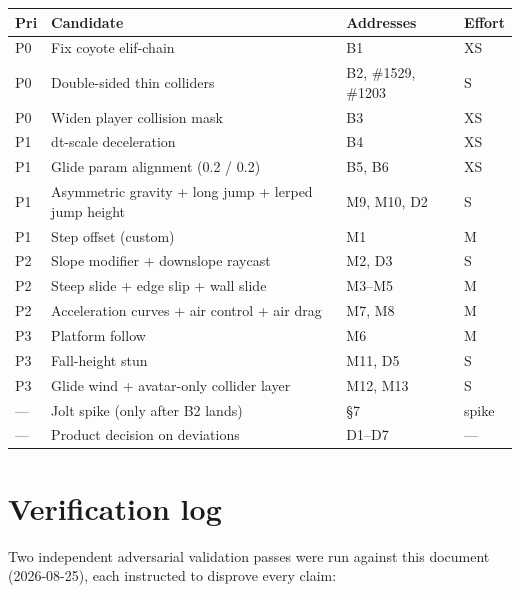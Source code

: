 \documentclass[11pt]{article}
\begin{document}
\begin{center}\footnotesize
\begin{tabular}{@{}l L{9cm} l l@{}}
\toprule
Pri & Candidate & Addresses & Effort \\
\midrule
P0 & Fix coyote elif-chain & B1 & XS \\
P0 & Double-sided thin colliders & B2, \#1529, \#1203 & S \\
P0 & Widen player collision mask & B3 & XS \\
P1 & dt-scale deceleration & B4 & XS \\
P1 & Glide param alignment (0.2 / 0.2) & B5, B6 & XS \\
P1 & Asymmetric gravity + long jump + lerped jump height & M9, M10, D2 & S \\
P1 & Step offset (custom) & M1 & M \\
P2 & Slope modifier + downslope raycast & M2, D3 & S \\
P2 & Steep slide + edge slip + wall slide & M3--M5 & M \\
P2 & Acceleration curves + air control + air drag & M7, M8 & M \\
P3 & Platform follow & M6 & M \\
P3 & Fall-height stun & M11, D5 & S \\
P3 & Glide wind + avatar-only collider layer & M12, M13 & S \\
--- & Jolt spike (only after B2 lands) & \S7 & spike \\
--- & Product decision on deviations & D1--D7 & --- \\
\bottomrule
\end{tabular}
\end{center}

\appendix
\section{Verification log}

Two independent adversarial validation passes were run against this document
(2026-08-25), each instructed to disprove every claim:
\end{document}
